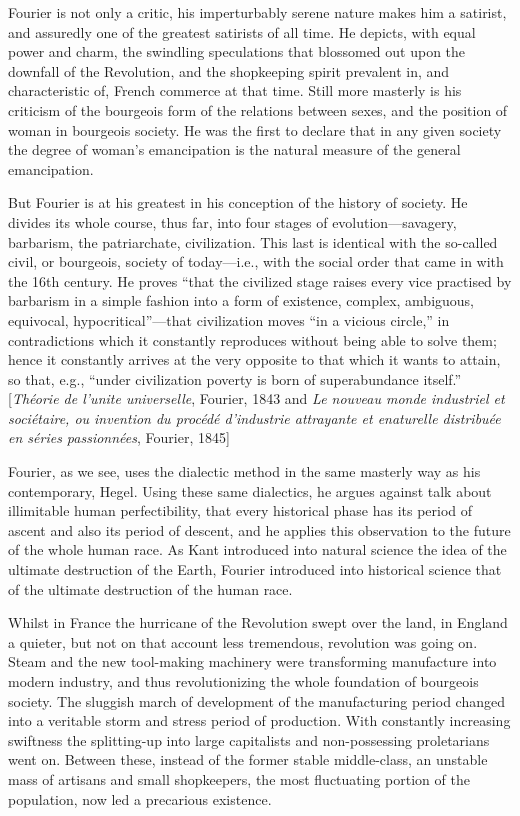 Fourier is not only a critic, his imperturbably serene nature makes him a
satirist, and assuredly one of the greatest satirists of all time. He depicts,
with equal power and charm, the swindling speculations that blossomed out upon
the downfall of the Revolution, and the shopkeeping spirit prevalent in, and
characteristic of, French commerce at that time. Still more masterly is his
criticism of the bourgeois form of the relations between sexes, and the position
of woman in bourgeois society. He was the first to declare that in any given
society the degree of woman’s emancipation is the natural measure of the general
emancipation. 

But Fourier is at his greatest in his conception of the history of society. He
divides its whole course, thus far, into four stages of evolution---savagery,
barbarism, the patriarchate, civilization. This last is identical with the
so-called civil, or bourgeois, society of today---i.e., with the social order
that came in with the 16th century. He proves ``that the civilized stage raises
every vice practised by barbarism in a simple fashion into a form of existence,
complex, ambiguous, equivocal, hypocritical''---that civilization moves ``in a
vicious circle,'' in contradictions which it constantly reproduces without being
able to solve them; hence it constantly arrives at the very opposite to that
which it wants to attain, so that, e.g., ``under civilization poverty is born of
superabundance itself.'' [\emph{Théorie de l’unite universelle}, Fourier, 1843
and \emph{Le nouveau monde industriel et sociétaire, ou invention du procédé
d'industrie attrayante et enaturelle distribuée en séries passionnées}, Fourier,
1845]

Fourier, as we see, uses the dialectic method in the same masterly way as his
contemporary, Hegel. Using these same dialectics, he argues against talk about
illimitable human perfectibility, that every historical phase has its period of
ascent and also its period of descent, and he applies this observation to the
future of the whole human race. As Kant introduced into natural science the idea
of the ultimate destruction of the Earth, Fourier introduced into historical
science that of the ultimate destruction of the human race.

Whilst in France the hurricane of the Revolution swept over the land, in England
a quieter, but not on that account less tremendous, revolution was going on.
Steam and the new tool-making machinery were transforming manufacture into
modern industry, and thus revolutionizing the whole foundation of bourgeois
society. The sluggish march of development of the manufacturing period changed
into a veritable storm and stress period of production. With constantly
increasing swiftness the splitting-up into large capitalists and non-possessing
proletarians went on. Between these, instead of the former stable middle-class,
an unstable mass of artisans and small shopkeepers, the most fluctuating portion
of the population, now led a precarious existence.

